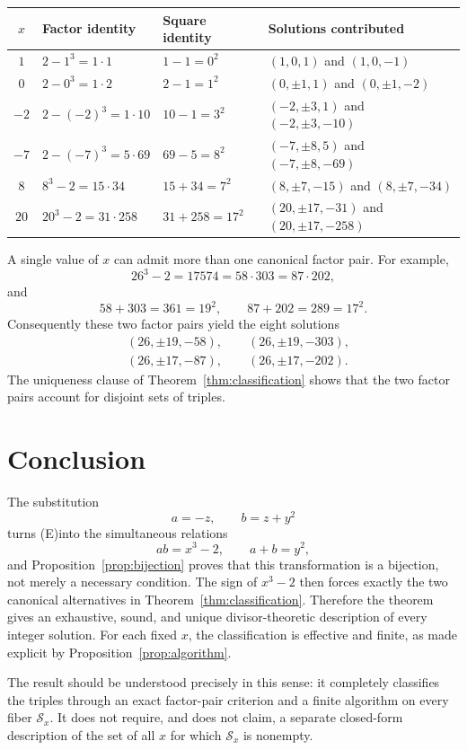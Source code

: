 \documentclass[11pt,a4paper]{article}
\theoremstyle{definition}
\theoremstyle{remark}
\newcommand{\Sols}{\mathscr S}
\newcommand{\eqE}{\textup{(E)}}
\begin{document}
\begin{center}
\renewcommand{\arraystretch}{1.25}
\begin{tabularx}{\textwidth}{@{}c>{\raggedright\arraybackslash}X>{\raggedright\arraybackslash}X>{\raggedright\arraybackslash}X@{}}
\toprule
$x$ & Factor identity & Square identity & Solutions contributed \\
\midrule
$1$
& $2-1^3=1\cdot1$
& $1-1=0^2$
& $(1,0,1)$ and $(1,0,-1)$ \\

$0$
& $2-0^3=1\cdot2$
& $2-1=1^2$
& $(0,\pm1,1)$ and $(0,\pm1,-2)$ \\

$-2$
& $2-(-2)^3=1\cdot10$
& $10-1=3^2$
& $(-2,\pm3,1)$ and $(-2,\pm3,-10)$ \\

$-7$
& $2-(-7)^3=5\cdot69$
& $69-5=8^2$
& $(-7,\pm8,5)$ and $(-7,\pm8,-69)$ \\

$8$
& $8^3-2=15\cdot34$
& $15+34=7^2$
& $(8,\pm7,-15)$ and $(8,\pm7,-34)$ \\

$20$
& $20^3-2=31\cdot258$
& $31+258=17^2$
& $(20,\pm17,-31)$ and $(20,\pm17,-258)$ \\
\bottomrule
\end{tabularx}
\end{center}

A single value of $x$ can admit more than one canonical factor pair.  For
example,
\[
 26^3-2=17574=58\cdot303=87\cdot202,
\]
and
\[
 58+303=361=19^2,
 \qquad
 87+202=289=17^2.
\]
Consequently these two factor pairs yield the eight solutions
\begin{align*}
 &(26,\pm19,-58),\qquad (26,\pm19,-303),\\
 &(26,\pm17,-87),\qquad (26,\pm17,-202).
\end{align*}
The uniqueness clause of Theorem~\ref{thm:classification} shows that the two
factor pairs account for disjoint sets of triples.

\section{Conclusion}

The substitution
\[
 a=-z,
 \qquad
 b=z+y^2
\]
turns \eqE into the simultaneous relations
\[
 ab=x^3-2,
 \qquad
 a+b=y^2,
\]
and Proposition~\ref{prop:bijection} proves that this transformation is a
bijection, not merely a necessary condition.  The sign of $x^3-2$ then forces
exactly the two canonical alternatives in
Theorem~\ref{thm:classification}.  Therefore the theorem gives an exhaustive,
sound, and unique divisor-theoretic description of every integer solution.
For each fixed $x$, the classification is effective and finite, as made
explicit by Proposition~\ref{prop:algorithm}.

The result should be understood precisely in this sense: it completely
classifies the triples through an exact factor-pair criterion and a finite
algorithm on every fiber $\Sols_x$.  It does not require, and does not claim,
a separate closed-form description of the set of all $x$ for which
$\Sols_x$ is nonempty.
\end{document}
